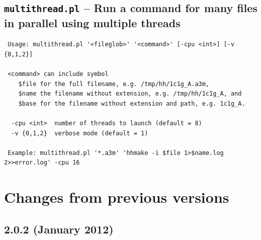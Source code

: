 \documentclass[11pt,a4paper]{article}
\begin{document}
\subsection{{\tt multithread.pl} -- Run a command for many files in parallel using multiple threads}

\small 
\begin{verbatim}
 Usage: multithread.pl '<fileglob>' '<command>' [-cpu <int>] [-v {0,1,2}]

 <command> can include symbol 
    $file for the full filename, e.g. /tmp/hh/1c1g_A.a3m, 
    $name the filename without extension, e.g. /tmp/hh/1c1g_A, and 
    $base for the filename without extension and path, e.g. 1c1g_A.

  -cpu <int>  number of threads to launch (default = 8)
  -v {0,1,2}  verbose mode (default = 1)

 Example: multithread.pl '*.a3m' 'hhmake -i $file 1>$name.log 2>>error.log' -cpu 16
\end{verbatim} 
\normalsize



\section{Changes from previous versions}

\subsection{2.0.2 (January 2012)}
\end{document}
